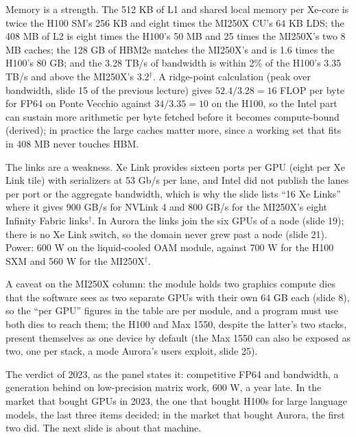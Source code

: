 \documentclass[11pt,letterpaper]{article}
\begin{document}
Memory is a strength. The 512 KB of L1 and shared local memory per Xe-core is twice the H100 SM's 256 KB and eight times the MI250X CU's 64 KB LDS; the 408 MB of L2 is eight times the H100's 50 MB and 25 times the MI250X's two 8 MB caches; the 128 GB of HBM2e matches the MI250X's and is 1.6 times the H100's 80 GB; and the 3.28 TB/s of bandwidth is within 2\% of the H100's 3.35 TB/s and above the MI250X's 3.2$^\dagger$. A ridge-point calculation (peak over bandwidth, slide 15 of the previous lecture) gives $52.4 / 3.28 = 16$ FLOP per byte for FP64 on Ponte Vecchio against $34 / 3.35 = 10$ on the H100, so the Intel part can sustain more arithmetic per byte fetched before it becomes compute-bound (derived); in practice the large caches matter more, since a working set that fits in 408 MB never touches HBM.

The links are a weakness. Xe Link provides sixteen ports per GPU (eight per Xe Link tile) with serializers at 53 Gb/s per lane, and Intel did not publish the lanes per port or the aggregate bandwidth, which is why the slide lists ``16 Xe Links'' where it gives 900 GB/s for NVLink 4 and 800 GB/s for the MI250X's eight Infinity Fabric links$^\dagger$. In Aurora the links join the six GPUs of a node (slide 19); there is no Xe Link switch, so the domain never grew past a node (slide 21). Power: 600 W on the liquid-cooled OAM module, against 700 W for the H100 SXM and 560 W for the MI250X$^\dagger$.

A caveat on the MI250X column: the module holds two graphics compute dies that the software sees as two separate GPUs with their own 64 GB each (slide 8), so the ``per GPU'' figures in the table are per module, and a program must use both dies to reach them; the H100 and Max 1550, despite the latter's two stacks, present themselves as one device by default (the Max 1550 can also be exposed as two, one per stack, a mode Aurora's users exploit, slide 25).

The verdict of 2023, as the panel states it: competitive FP64 and bandwidth, a generation behind on low-precision matrix work, 600 W, a year late. In the market that bought GPUs in 2023, the one that bought H100s for large language models, the last three items decided; in the market that bought Aurora, the first two did. The next slide is about that machine.
\end{document}
